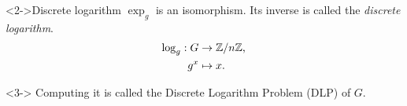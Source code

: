 \documentclass[10pt,usepdftitle=false]{beamer}
\begin{document}
\begin{frame}
\begin{columns}
\begin{column}{0.6\textwidth}
      \begin{block}<2->{Discrete logarithm} $\exp_g$ is an
        isomorphism. Its inverse is called the \emph{discrete
          logarithm}.
        \begin{align*}
          \log_g : G &\rightarrow \mathbb{Z}/n\mathbb{Z}\text{,}\\
          g^x&\mapsto x\text{.}
        \end{align*}

        \begin{uncoverenv}<3-> Computing it is called the
          \alert{Discrete Logarithm Problem} (DLP) of $G$.
        \end{uncoverenv}
      \end{block}
    \end{column}
  \end{columns}
\end{frame}

\end{document}
